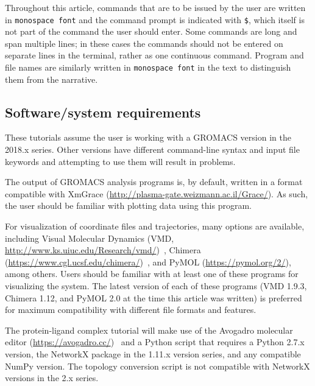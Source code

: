 \documentclass[9pt,tutorial,pubversion]{livecoms}
\begin{document}
Throughout this article, commands that are to be issued by the user are written in \texttt{monospace font} and the command prompt is indicated with \texttt{\$}, which itself is not part of the command the user should enter. Some commands are long and span multiple lines; in these cases the commands should not be entered on separate lines in the terminal, rather as one continuous command. Program and file names are similarly written in \texttt{monospace font} in the text to distinguish them from the narrative.

\subsection{Software/system requirements}
These tutorials assume the user is working with a GROMACS version in the 2018.x series. Other versions have different command-line syntax and input file keywords and attempting to use them will result in problems.

The output of GROMACS analysis programs is, by default, written in a format compatible with XmGrace (\url{http://plasma-gate.weizmann.ac.il/Grace/}). As such, the user should be familiar with plotting data using this program.

For visualization of coordinate files and trajectories, many options are available, including Visual Molecular Dynamics (VMD, \url{http://www.ks.uiuc.edu/Research/vmd/})~\cite{Humphrey1996}, Chimera (\url{https://www.cgl.ucsf.edu/chimera/})~\cite{Petersen2004}, and PyMOL (\url{https://pymol.org/2/}), among others. Users should be familiar with at least one of these programs for visualizing the system. The latest version of each of these programs (VMD 1.9.3, Chimera 1.12, and PyMOL 2.0 at the time this article was written) is preferred for maximum compatibility with different file formats and features.

The protein-ligand complex tutorial will make use of the Avogadro molecular editor (\url{https://avogadro.cc/})~\cite{Hanwell2012} and a Python script that requires a Python 2.7.x version, the NetworkX package in the 1.11.x version series, and any compatible NumPy version. The topology conversion script is not compatible with NetworkX versions in the 2.x series.
\end{document}
